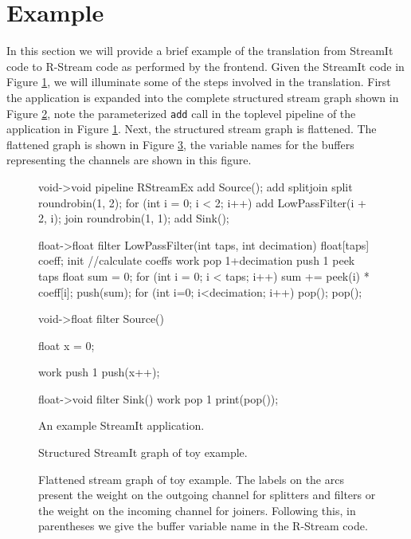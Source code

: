 \documentclass[10pt, letterpaper, onecolumn]{article}
\begin{document}
\section{Example}
\label{example}
In this section we will provide a brief example of the translation
from StreamIt code to R-Stream code as performed by the frontend.
Given the StreamIt code in Figure \ref{fig:example}, we will
illuminate some of the steps involved in the translation.  First the
application is expanded into the complete structured stream graph
shown in Figure \ref{fig:structured}, note the parameterized {\tt add}
call in the toplevel pipeline of the application in Figure
\ref{fig:example}.  Next, the structured stream graph is flattened.
The flattened graph is shown in Figure \ref{fig:flatgraph}, the
variable names for the buffers representing the channels are shown in
this figure.

\begin{figure}[t]
\scriptsize
\begin{verbatimtab}[4]
void->void pipeline RStreamEx {
    add Source();
    add splitjoin {
	split roundrobin(1, 2);
	for (int i = 0; i < 2; i++)
	    add LowPassFilter(i + 2, i);
	join roundrobin(1, 1);
    }
    add Sink();
}

float->float filter LowPassFilter(int taps, int decimation) {
  float[taps] coeff;
  init {
    //calculate coeffs
  }
  work pop 1+decimation push 1 peek taps {
    float sum = 0;
    for (int i = 0; i < taps; i++)
      sum += peek(i) * coeff[i];
    push(sum);
    for (int i=0; i<decimation; i++)
      pop();
    pop();
  }
}

void->float filter Source() 
{
  float x = 0;
  
  work push 1 {
    push(x++);
  }
}

float->void filter Sink() 
{
  work pop 1 {
    print(pop());
  }
}
\end{verbatimtab}
\caption{\protect\small An example StreamIt application.
\protect\label{fig:example}}
\end{figure}

\begin{figure}
\centering
{}
\caption{Structured StreamIt graph of toy example.
\label{fig:structured}}
\end{figure}

\begin{figure}
\centering
{}
\caption{Flattened stream graph of toy example.  The labels on the
  arcs present the weight on the outgoing channel for splitters and
  filters or the weight on the incoming channel for joiners.  Following
  this, in parentheses we give the buffer variable name in the R-Stream code.
\label{fig:flatgraph}}
\end{figure}
\end{document}
